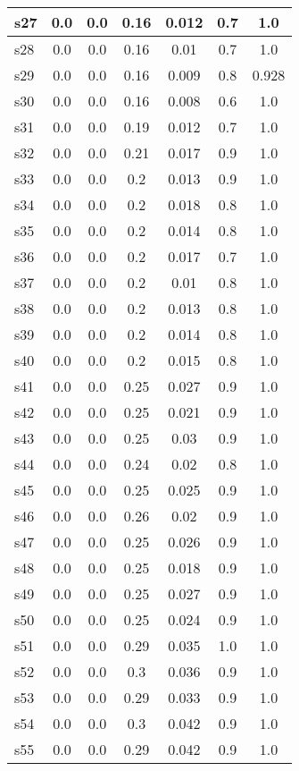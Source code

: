 \documentclass{article}
\begin{document}
\begin{tabular}{|l|c|c|c|c|c|c|}
\hline
s27 &0.0 & 0.0 & 0.16 & 0.012 & 0.7 & 1.0\\
\hline
s28 &0.0 & 0.0 & 0.16 & 0.01 & 0.7 & 1.0\\
\hline
s29 &0.0 & 0.0 & 0.16 & 0.009 & 0.8 & 0.928\\
\hline
s30 &0.0 & 0.0 & 0.16 & 0.008 & 0.6 & 1.0\\
\hline
s31 &0.0 & 0.0 & 0.19 & 0.012 & 0.7 & 1.0\\
\hline
s32 &0.0 & 0.0 & 0.21 & 0.017 & 0.9 & 1.0\\
\hline
s33 &0.0 & 0.0 & 0.2 & 0.013 & 0.9 & 1.0\\
\hline
s34 &0.0 & 0.0 & 0.2 & 0.018 & 0.8 & 1.0\\
\hline
s35 &0.0 & 0.0 & 0.2 & 0.014 & 0.8 & 1.0\\
\hline
s36 &0.0 & 0.0 & 0.2 & 0.017 & 0.7 & 1.0\\
\hline
s37 &0.0 & 0.0 & 0.2 & 0.01 & 0.8 & 1.0\\
\hline
s38 &0.0 & 0.0 & 0.2 & 0.013 & 0.8 & 1.0\\
\hline
s39 &0.0 & 0.0 & 0.2 & 0.014 & 0.8 & 1.0\\
\hline
s40 &0.0 & 0.0 & 0.2 & 0.015 & 0.8 & 1.0\\
\hline
s41 &0.0 & 0.0 & 0.25 & 0.027 & 0.9 & 1.0\\
\hline
s42 &0.0 & 0.0 & 0.25 & 0.021 & 0.9 & 1.0\\
\hline
s43 &0.0 & 0.0 & 0.25 & 0.03 & 0.9 & 1.0\\
\hline
s44 &0.0 & 0.0 & 0.24 & 0.02 & 0.8 & 1.0\\
\hline
s45 &0.0 & 0.0 & 0.25 & 0.025 & 0.9 & 1.0\\
\hline
s46 &0.0 & 0.0 & 0.26 & 0.02 & 0.9 & 1.0\\
\hline
s47 &0.0 & 0.0 & 0.25 & 0.026 & 0.9 & 1.0\\
\hline
s48 &0.0 & 0.0 & 0.25 & 0.018 & 0.9 & 1.0\\
\hline
s49 &0.0 & 0.0 & 0.25 & 0.027 & 0.9 & 1.0\\
\hline
s50 &0.0 & 0.0 & 0.25 & 0.024 & 0.9 & 1.0\\
\hline
s51 &0.0 & 0.0 & 0.29 & 0.035 & 1.0 & 1.0\\
\hline
s52 &0.0 & 0.0 & 0.3 & 0.036 & 0.9 & 1.0\\
\hline
s53 &0.0 & 0.0 & 0.29 & 0.033 & 0.9 & 1.0\\
\hline
s54 &0.0 & 0.0 & 0.3 & 0.042 & 0.9 & 1.0\\
\hline
s55 &0.0 & 0.0 & 0.29 & 0.042 & 0.9 & 1.0\\

\end{tabular}
\end{document}
